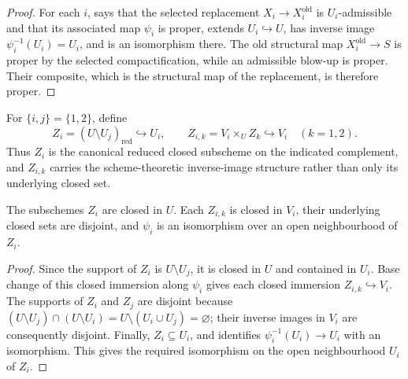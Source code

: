 \begin{proof}
  For each $i$,  says that the selected
  replacement $X_i\to X_i^{\mathrm{old}}$ is $U_i$-admissible and that its
  associated map $\psi_i$ is proper, extends $U_i\hookrightarrow U$, has
  inverse image $\psi_i^{-1}(U_i)=U_i$, and is an isomorphism there.  The
  old structural map $X_i^{\mathrm{old}}\to S$ is proper by the selected
  compactification, while an admissible blow-up is proper.  Their composite,
  which is the structural map of the replacement, is therefore proper.
\end{proof}

\begin{definition}
  \label{def:nagata-two-open-boundary-loci}

  For $\{i,j\}=\{1,2\}$, define
  \[
    Z_i=(U\setminus U_j)_{\mathrm{red}}\hookrightarrow U_i,
    \qquad
    Z_{i,k}=V_i\times_U Z_k\hookrightarrow V_i
    \quad(k=1,2).
  \]
  Thus $Z_i$ is the canonical reduced closed subscheme on the indicated
  complement, and $Z_{i,k}$ carries the scheme-theoretic inverse-image
  structure rather than only its underlying closed set.
\end{definition}


\begin{lemma}
  \label{lemma:nagata-boundary-loci}

  The subschemes $Z_i$ are closed in $U$.  Each $Z_{i,k}$ is closed in
  $V_i$, their underlying closed sets are disjoint, and $\psi_i$ is an
  isomorphism over an open neighbourhood of $Z_i$.
\end{lemma}

\begin{proof}
  Since the support of $Z_i$ is $U\setminus U_j$, it is closed in $U$ and
  contained in $U_i$.  Base change of this closed immersion along $\psi_i$
  gives each closed immersion $Z_{i,k}\hookrightarrow V_i$.  The supports of
  $Z_i$ and $Z_j$ are disjoint because
  $(U\setminus U_j)\cap(U\setminus U_i)=U\setminus(U_i\cup U_j)=\varnothing$;
  their inverse images in $V_i$ are consequently disjoint.  Finally,
  $Z_i\subseteq U_i$, and  identifies
  $\psi_i^{-1}(U_i)\to U_i$ with an isomorphism.  This gives the required
  isomorphism on the open neighbourhood $U_i$ of $Z_i$.
\end{proof}

